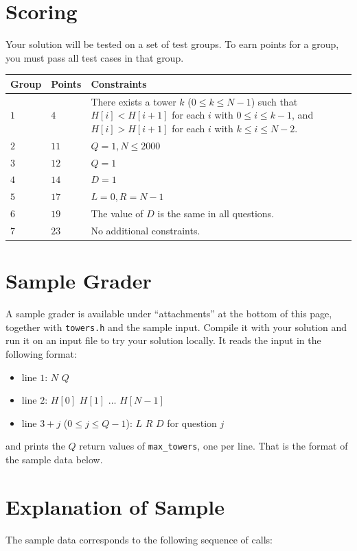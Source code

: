 \section*{Scoring}
Your solution will be tested on a set of test groups.
To earn points for a group, you must pass all test cases in that group.

\noindent
\begin{tabular}{| l | l | p{12cm} |}
  \hline
  \textbf{Group} & \textbf{Points} & \textbf{Constraints} \\ \hline
  $1$ & $4$  & There exists a tower $k$ ($0 \leq k \leq N-1$) such that $H[i] < H[i+1]$ for each $i$
               with $0 \leq i \leq k-1$, and $H[i] > H[i+1]$ for each $i$ with
               $k \leq i \leq N-2$. \\ \hline
  $2$ & $11$ & $Q = 1, N \leq 2000$ \\ \hline
  $3$ & $12$ & $Q = 1$ \\ \hline
  $4$ & $14$ & $D = 1$ \\ \hline
  $5$ & $17$ & $L = 0, R = N-1$ \\ \hline
  $6$ & $19$ & The value of $D$ is the same in all questions. \\ \hline
  $7$ & $23$ & No additional constraints. \\ \hline
\end{tabular}

\section*{Sample Grader}
A sample grader is available under ``attachments'' at the bottom of this page, together with
\texttt{towers.h} and the sample input. Compile it with your solution and run it on an input file to
try your solution locally. It reads the input in the following format:
\begin{itemize}
  \item line $1$: $N$ $Q$
  \item line $2$: $H[0]$ $H[1]$ $\ldots$ $H[N-1]$
  \item line $3 + j$ ($0 \leq j \leq Q-1$): $L$ $R$ $D$ for question $j$
\end{itemize}
and prints the $Q$ return values of \texttt{max\_towers}, one per line. That is the format of the
sample data below.

\section*{Explanation of Sample}
The sample data corresponds to the following sequence of calls:

